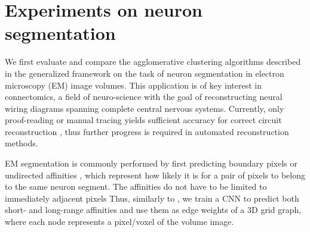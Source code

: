 


\section{Experiments on neuron segmentation}\label{sec:neuro_segm_exp}

We first evaluate and compare the agglomerative clustering algorithms described in the generalized framework on the task of neuron segmentation in electron microscopy (EM) image volumes. This application is of key interest in connectomics, a field of neuro-science with the goal of reconstructing neural wiring diagrams spanning complete central nervous systems. Currently, only proof-reading or manual tracing yields sufficient accuracy for correct circuit reconstruction \cite{schlegel2017learning}, thus further progress is required in automated reconstruction methods.

EM segmentation is commonly performed by first predicting 
boundary pixels \cite{beier2017multicut,ciresan2012deep} or undirected affinities \cite{wolf2018mutex,lee2017superhuman,funke2018large}, which represent how likely it is for a pair of pixels to belong to the same neuron segment. 
The affinities do not have to be limited to immediately adjacent pixels
Thus, similarly to \cite{lee2017superhuman}, we train a CNN to predict both short- and long-range affinities
and use them as edge weights of a 3D grid graph, where each node represents a pixel/voxel of the volume image. 
